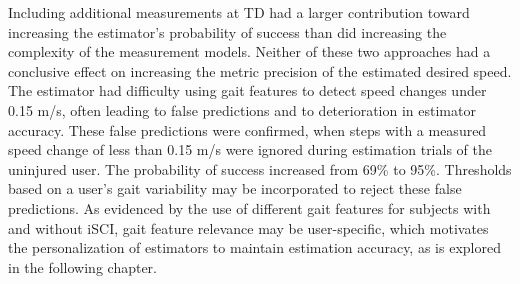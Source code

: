 Including additional measurements at TD had a larger contribution toward increasing the estimator's probability of success than did increasing the complexity of the measurement models. Neither of these two approaches had a conclusive effect on increasing the metric precision of the estimated desired speed. The estimator had difficulty using gait features to detect speed changes under 0.15 m/s, often leading to false predictions and to deterioration in estimator accuracy. These false predictions were confirmed, when steps with a measured speed change of less than 0.15 m/s were ignored during estimation trials of the uninjured user. The probability of success increased from 69\% to 95\%. Thresholds based on a user's gait variability may be incorporated to reject these false predictions. As evidenced by the use of different gait features for subjects with and without iSCI, gait feature relevance may be user-specific, which motivates the personalization of estimators to maintain estimation accuracy, as is explored in the following chapter.